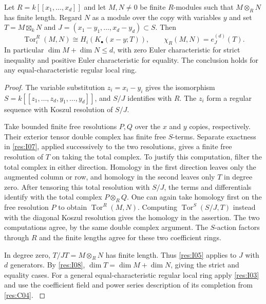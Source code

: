 \begin{theorem}\label{res:I09}
Let \(R=k[[x_1,\ldots,x_d]]\) and let \(M,N\ne0\) be finite
\(R\)-modules such that \(M\otimes_R N\) has finite length. Regard
\(N\) as a module over the copy with variables \(y\) and set
\(T=M\boxtimes_k N\) and \(J=(x_1-y_1,\ldots,x_d-y_d)\subset S\).
Then
\[
 \operatorname{Tor}_i^R(M,N)\cong H_i(K_\bullet(x-y;T)),\qquad
 \chi_R(M,N)=e^{(d)}_J(T).
\]
In particular \(\dim M+\dim N\le d\), with zero Euler
characteristic for strict inequality and positive Euler
characteristic for equality. The conclusion holds for any
equal-characteristic regular local ring.
\end{theorem}
\begin{proof}
The variable substitution \(z_i=x_i-y_i\) gives the isomorphism
\(S=k[[z_1,\ldots,z_d,y_1,\ldots,y_d]]\), and \(S/J\) identifies
with \(R\). The \(z_i\) form a regular sequence with Koszul
resolution of \(S/J\).

Take bounded finite free resolutions \(P,Q\) over the \(x\) and
\(y\) copies, respectively. Their exterior tensor double complex
has finite free \(S\)-terms. Separate exactness in
\ref{res:I07}, applied successively to the two resolutions, gives
a finite free resolution of \(T\) on taking the total complex.
To justify this computation, filter the total complex in either
direction. Homology in the first direction leaves only the
augmented column or row, and homology in the second leaves only
\(T\) in degree zero. After tensoring this total resolution with
\(S/J\), the terms and differentials identify with the total
complex \(P\otimes_R Q\). One can again take homology first on the
free resolution \(P\) to obtain \(\operatorname{Tor}^R(M,N)\).
Computing \(\operatorname{Tor}^S(S/J,T)\) instead with the
diagonal Koszul resolution gives the homology in the assertion.
The two computations agree, by the same double complex argument.
The \(S\)-action factors through \(R\) and the finite lengths
agree for these two coefficient rings.

In degree zero,
\(T/JT=M\otimes_R N\) has finite length. Thus \ref{res:I05}
applies to \(J\) with \(d\) generators. By \ref{res:I08},
\(\dim T=\dim M+\dim N\), giving the strict and equality cases.
For a general equal-characteristic regular local ring apply
\ref{res:I03} and use the coefficient field and power series
description of its completion from \ref{res:C04}.
\cite[Chapter V, \S B.3, Theorem 1]{serre-local}
\end{proof}

